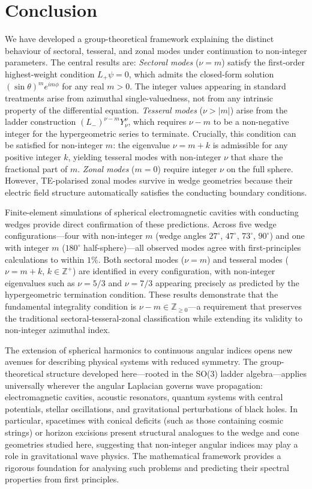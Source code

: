 \documentclass[
  aip,
  amsmath,amssymb,
  preprint
]{revtex4-1}
\begin{document}
\section{Conclusion}
\label{sec:conclusion}
We have developed a group-theoretical framework explaining the distinct behaviour of sectoral, tesseral, and zonal modes under continuation to non-integer parameters. The central results are:
\noindent \textit{Sectoral modes} ($\nu = m$) satisfy the first-order highest-weight condition $L_+ \psi = 0$, which admits the closed-form solution $(\sin\theta)^m e^{im\phi}$ for any real $m > 0$. The integer values appearing in standard treatments arise from azimuthal single-valuedness, not from any intrinsic property of the differential equation.
\noindent \textit{Tesseral modes} ($\nu > |m|$) arise from the ladder construction $(L_-)^{\nu - m} Y_\nu^\nu$, which requires $\nu - m$ to be a non-negative integer for the hypergeometric series to terminate. Crucially, this condition can be satisfied for non-integer $m$: the eigenvalue $\nu = m + k$ is admissible for any positive integer $k$, yielding tesseral modes with non-integer $\nu$ that share the fractional part of $m$.
\noindent \textit{Zonal modes} ($m = 0$) require integer $\nu$ on the full sphere. However, TE-polarised zonal modes survive in wedge geometries because their electric field structure automatically satisfies the conducting boundary conditions.

Finite-element simulations of spherical electromagnetic cavities with conducting wedges provide direct confirmation of these predictions. Across five wedge configurations---four with non-integer $m$ (wedge angles $27^\circ$, $47^\circ$, $73^\circ$, $90^\circ$) and one with integer $m$ ($180^\circ$ half-sphere)---all observed modes agree with first-principles calculations to within $1\%$. Both sectoral modes ($\nu = m$) and tesseral modes ($\nu = m + k$, $k \in \mathbb{Z}^+$) are identified in every configuration, with non-integer eigenvalues such as $\nu = 5/3$ and $\nu = 7/3$ appearing precisely as predicted by the hypergeometric termination condition. These results demonstrate that the fundamental integrality condition is 
$\nu - m \in \mathbb{Z}_{\geq 0}$---a requirement that preserves the traditional sectoral-tesseral-zonal classification while extending its validity to non-integer azimuthal index.

The extension of spherical harmonics to continuous angular indices opens new avenues for describing physical systems with reduced symmetry. The group-theoretical structure developed here---rooted in the SO(3) ladder algebra---applies universally wherever the angular Laplacian governs wave propagation: electromagnetic cavities, acoustic resonators, quantum systems with central potentials, stellar oscillations, and gravitational perturbations of black holes. In particular, spacetimes with conical deficits (such as those containing cosmic strings) or horizon excisions present structural analogues to the wedge and cone geometries studied here, suggesting that non-integer angular indices may play a role in gravitational wave physics. The mathematical framework provides a rigorous foundation for analysing such problems and predicting their spectral properties from first principles.
\end{document}
